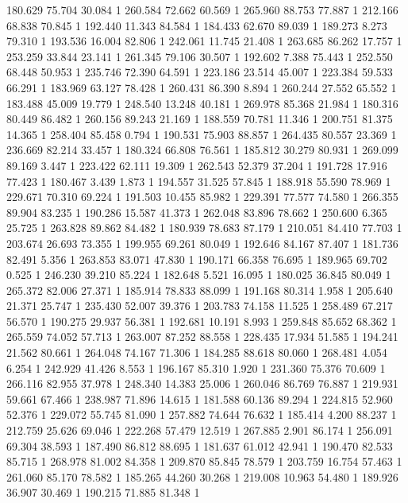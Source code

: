 	180.629	75.704	30.084	1
	260.584	72.662	60.569	1
	265.960	88.753	77.887	1
	212.166	68.838	70.845	1
	192.440	11.343	84.584	1
	184.433	62.670	89.039	1
	189.273	8.273	79.310	1
	193.536	16.004	82.806	1
	242.061	11.745	21.408	1
	263.685	86.262	17.757	1
	253.259	33.844	23.141	1
	261.345	79.106	30.507	1
	192.602	7.388	75.443	1
	252.550	68.448	50.953	1
	235.746	72.390	64.591	1
	223.186	23.514	45.007	1
	223.384	59.533	66.291	1
	183.969	63.127	78.428	1
	260.431	86.390	8.894	1
	260.244	27.552	65.552	1
	183.488	45.009	19.779	1
	248.540	13.248	40.181	1
	269.978	85.368	21.984	1
	180.316	80.449	86.482	1
	260.156	89.243	21.169	1
	188.559	70.781	11.346	1
	200.751	81.375	14.365	1
	258.404	85.458	0.794	1
	190.531	75.903	88.857	1
	264.435	80.557	23.369	1
	236.669	82.214	33.457	1
	180.324	66.808	76.561	1
	185.812	30.279	80.931	1
	269.099	89.169	3.447	1
	223.422	62.111	19.309	1
	262.543	52.379	37.204	1
	191.728	17.916	77.423	1
	180.467	3.439	1.873	1
	194.557	31.525	57.845	1
	188.918	55.590	78.969	1
	229.671	70.310	69.224	1
	191.503	10.455	85.982	1
	229.391	77.577	74.580	1
	266.355	89.904	83.235	1
	190.286	15.587	41.373	1
	262.048	83.896	78.662	1
	250.600	6.365	25.725	1
	263.828	89.862	84.482	1
	180.939	78.683	87.179	1
	210.051	84.410	77.703	1
	203.674	26.693	73.355	1
	199.955	69.261	80.049	1
	192.646	84.167	87.407	1
	181.736	82.491	5.356	1
	263.853	83.071	47.830	1
	190.171	66.358	76.695	1
	189.965	69.702	0.525	1
	246.230	39.210	85.224	1
	182.648	5.521	16.095	1
	180.025	36.845	80.049	1
	265.372	82.006	27.371	1
	185.914	78.833	88.099	1
	191.168	80.314	1.958	1
	205.640	21.371	25.747	1
	235.430	52.007	39.376	1
	203.783	74.158	11.525	1
	258.489	67.217	56.570	1
	190.275	29.937	56.381	1
	192.681	10.191	8.993	1
	259.848	85.652	68.362	1
	265.559	74.052	57.713	1
	263.007	87.252	88.558	1
	228.435	17.934	51.585	1
	194.241	21.562	80.661	1
	264.048	74.167	71.306	1
	184.285	88.618	80.060	1
	268.481	4.054	6.254	1
	242.929	41.426	8.553	1
	196.167	85.310	1.920	1
	231.360	75.376	70.609	1
	266.116	82.955	37.978	1
	248.340	14.383	25.006	1
	260.046	86.769	76.887	1
	219.931	59.661	67.466	1
	238.987	71.896	14.615	1
	181.588	60.136	89.294	1
	224.815	52.960	52.376	1
	229.072	55.745	81.090	1
	257.882	74.644	76.632	1
	185.414	4.200	88.237	1
	212.759	25.626	69.046	1
	222.268	57.479	12.519	1
	267.885	2.901	86.174	1
	256.091	69.304	38.593	1
	187.490	86.812	88.695	1
	181.637	61.012	42.941	1
	190.470	82.533	85.715	1
	268.978	81.002	84.358	1
	209.870	85.845	78.579	1
	203.759	16.754	57.463	1
	261.060	85.170	78.582	1
	185.265	44.260	30.268	1
	219.008	10.963	54.480	1
	189.926	36.907	30.469	1
	190.215	71.885	81.348	1
